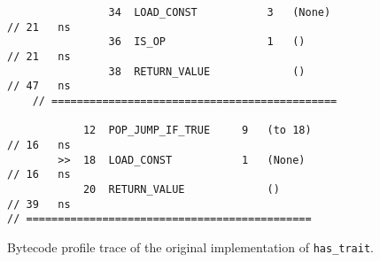 \begin{code}
\begin{verbatim}
                34  LOAD_CONST           3   (None)                                         // 21   ns
                36  IS_OP                1   ()                                             // 21   ns
                38  RETURN_VALUE             ()                                             // 47   ns
    // =============================================

            12  POP_JUMP_IF_TRUE     9   (to 18)                                            // 16   ns
        >>  18  LOAD_CONST           1   (None)                                             // 16   ns
            20  RETURN_VALUE             ()                                                 // 39   ns
// =============================================
    \end{verbatim}
    \caption{Bytecode profile trace of the original implementation of \texttt{has_trait}.}
    \label{listing:bytecode-profiles-hastrait-original}
\end{code}

\vspace{2em}

